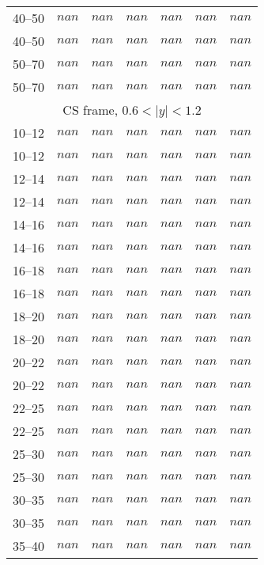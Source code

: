 \documentclass{article}
\begin{document}
\begin{table}[!h]
\begin{tabular}{|c|cccccc|}
40--50   &  $nan$  & $nan$  &  $nan$ &  $nan$  & $nan$  &  $nan$ \\
40--50   &  $nan$  & $nan$  &  $nan$ &  $nan$  & $nan$  &  $nan$ \\
50--70   &  $nan$  & $nan$  &  $nan$ &  $nan$  & $nan$  &  $nan$ \\
50--70   &  $nan$  & $nan$  &  $nan$ &  $nan$  & $nan$  &  $nan$ \\
\hline \multicolumn{7}{|c|}{CS frame, $0.6 < |y| < 1.2$}\\ \hline \rule{0pt}{4mm}
10--12   &  $nan$  & $nan$  &  $nan$ &  $nan$  & $nan$  &  $nan$ \\
10--12   &  $nan$  & $nan$  &  $nan$ &  $nan$  & $nan$  &  $nan$ \\
12--14   &  $nan$  & $nan$  &  $nan$ &  $nan$  & $nan$  &  $nan$ \\
12--14   &  $nan$  & $nan$  &  $nan$ &  $nan$  & $nan$  &  $nan$ \\
14--16   &  $nan$  & $nan$  &  $nan$ &  $nan$  & $nan$  &  $nan$ \\
14--16   &  $nan$  & $nan$  &  $nan$ &  $nan$  & $nan$  &  $nan$ \\
16--18   &  $nan$  & $nan$  &  $nan$ &  $nan$  & $nan$  &  $nan$ \\
16--18   &  $nan$  & $nan$  &  $nan$ &  $nan$  & $nan$  &  $nan$ \\
18--20   &  $nan$  & $nan$  &  $nan$ &  $nan$  & $nan$  &  $nan$ \\
18--20   &  $nan$  & $nan$  &  $nan$ &  $nan$  & $nan$  &  $nan$ \\
20--22   &  $nan$  & $nan$  &  $nan$ &  $nan$  & $nan$  &  $nan$ \\
20--22   &  $nan$  & $nan$  &  $nan$ &  $nan$  & $nan$  &  $nan$ \\
22--25   &  $nan$  & $nan$  &  $nan$ &  $nan$  & $nan$  &  $nan$ \\
22--25   &  $nan$  & $nan$  &  $nan$ &  $nan$  & $nan$  &  $nan$ \\
25--30   &  $nan$  & $nan$  &  $nan$ &  $nan$  & $nan$  &  $nan$ \\
25--30   &  $nan$  & $nan$  &  $nan$ &  $nan$  & $nan$  &  $nan$ \\
30--35   &  $nan$  & $nan$  &  $nan$ &  $nan$  & $nan$  &  $nan$ \\
30--35   &  $nan$  & $nan$  &  $nan$ &  $nan$  & $nan$  &  $nan$ \\
35--40   &  $nan$  & $nan$  &  $nan$ &  $nan$  & $nan$  &  $nan$ \\

\end{tabular}
\end{table}
\end{document}
